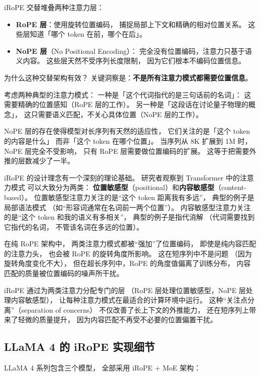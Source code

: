 iRoPE 交替堆叠两种注意力层：
\begin{itemize}[noitemsep]
  \item \textbf{RoPE 层}：使用旋转位置编码，
        捕捉局部上下文和精确的相对位置关系。
        这些层知道「哪个 token 在前，哪个在后」。
  \item \textbf{NoPE 层}（No Positional Encoding）：
        完全没有位置编码，注意力只基于语义内容。
        这些层天然不受序列长度限制，
        因为它们根本不编码位置信息。
\end{itemize}

为什么这种交替架构有效？
关键洞察是：\textbf{不是所有注意力模式都需要位置信息}。

考虑两种典型的注意力模式：
一种是「这个代词指代的是三句话前的名词」：
这需要精确的位置感知（RoPE 层的工作）。
另一种是「这段话在讨论量子物理的概念」，
这只需要语义匹配，不关心具体位置（NoPE 层的工作）。

NoPE 层的存在使得模型对长序列有天然的适应性，
它们关注的是「这个 token 的内容是什么」
而非「这个 token 在哪个位置」。
当序列从 8K 扩展到 1M 时，
NoPE 层完全不受影响，
只有 RoPE 层需要做位置编码的扩展。
这等于把需要外推的层数减少了一半。

iRoPE 的设计理念有一个深刻的理论基础。
研究者观察到 Transformer 中的注意力模式
可以大致分为两类：
\textbf{位置敏感型}（positional）和\textbf{内容敏感型}（content-based）。
位置敏感型注意力关注的是“这个 token 距离我有多远”，
典型的例子是局部语法模式
（如“形容词通常在名词前一两个位置”）。
内容敏感型注意力关注的是“这个 token 和我的语义有多相关”，
典型的例子是指代消解
（代词需要找到它指代的名词，
不管该名词在多远的位置）。

在纯 RoPE 架构中，
两类注意力模式都被“强加”了位置编码，
即使是纯内容匹配的注意力头，
也会被 RoPE 的旋转角度所影响。
这在短序列中不是问题
（因为旋转角度变化不大），
但在超长序列中，RoPE 的角度值偏离了训练分布，
内容匹配的质量被位置编码的噪声所干扰。

iRoPE 通过为两类注意力分配专门的层
（RoPE 层处理位置敏感型，NoPE 层处理内容敏感型），
让每种注意力模式在最适合的计算环境中运行。
这种“关注点分离”（separation of concerns）
不仅改善了长上下文的外推能力，
还在短序列上带来了轻微的质量提升，
因为内容匹配不再受不必要的位置偏置干扰。

\subsection{LLaMA 4 的 iRoPE 实现细节}

LLaMA 4 系列包含三个模型，
全部采用 iRoPE + MoE 架构：

